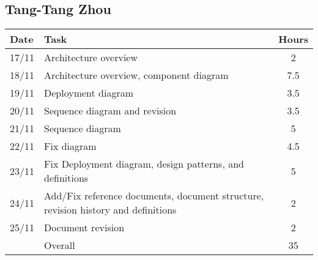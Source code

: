 \subsection{Tang-Tang Zhou}

\begin{table}[H]
\begin{tabularx}{\textwidth}{|l|X|c|}
\hline
\rowcolor[HTML]{C0C0C0} 
Date & Task & Hours\\ \hline
17/11 & Architecture overview & 2\\ \hline
18/11 & Architecture overview, component diagram & 7.5 \\ \hline
19/11 & Deployment diagram & 3.5\\ \hline
20/11 & Sequence diagram and revision & 3.5\\ \hline
21/11 & Sequence diagram & 5 \\ \hline
22/11 & Fix diagram & 4.5 \\ \hline
23/11 & Fix Deployment diagram, design patterns, and definitions  & 5 \\ \hline
24/11 & Add/Fix reference documents, document structure, revision history and definitions & 2 \\ \hline
25/11 & Document revision & 2 \\ \hline
\rowcolor[HTML]{C0C0C0} 
& Overall & 35 \\ \hline
\end{tabularx}
\end{table}